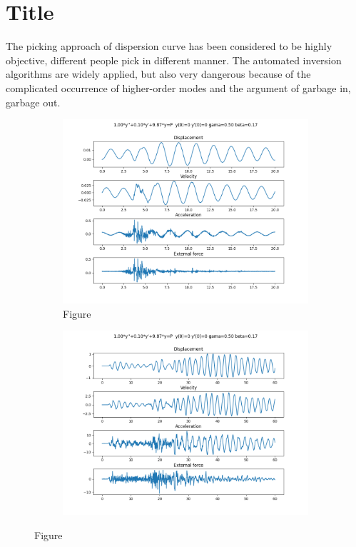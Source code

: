 \section{Title}
The picking approach of dispersion curve has been considered to be highly objective, different people pick in different manner. The automated inversion algorithms are widely applied, but also very dangerous because of the complicated occurrence of higher-order modes and the argument of garbage in, garbage out.


\begin{figure}[!t]
    \centering
    \begin{subfigure}[b]{0.45\textwidth}
        \centering
        \includegraphics[width=\textwidth]{images/f1.png}
        \caption{Figure}
        \label{tab:wave1}
    \end{subfigure}
    \hfill
    \begin{subfigure}[b]{0.45\textwidth}
        \centering
        \includegraphics[width=\textwidth]{images/f2.png}
        \caption{}
        \label{tab:wave2}
    \end{subfigure}
    \hspace{1em}
    \caption{Figure}
    \label{tab:wave}
\end{figure}
